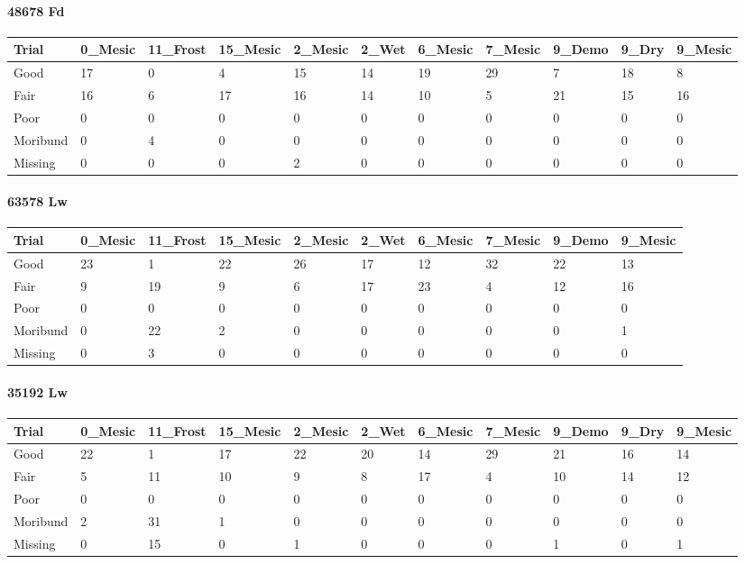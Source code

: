 \documentclass[
]{article}
\begin{document}
\hypertarget{fd-2}{%
\paragraph{48678 Fd}\label{fd-2}}

\begin{tabular}{l|l|l|l|l|l|l|l|l|l|l}
\hline
Trial & 0\_Mesic & 11\_Frost & 15\_Mesic & 2\_Mesic & 2\_Wet & 6\_Mesic & 7\_Mesic & 9\_Demo & 9\_Dry & 9\_Mesic\\
\hline
Good & 17 & 0 & 4 & 15 & 14 & 19 & 29 & 7 & 18 & 8\\
\hline
Fair & 16 & 6 & 17 & 16 & 14 & 10 & 5 & 21 & 15 & 16\\
\hline
Poor & 0 & 0 & 0 & 0 & 0 & 0 & 0 & 0 & 0 & 0\\
\hline
Moribund & 0 & 4 & 0 & 0 & 0 & 0 & 0 & 0 & 0 & 0\\
\hline
Missing & 0 & 0 & 0 & 2 & 0 & 0 & 0 & 0 & 0 & 0\\
\hline
\end{tabular}

\hypertarget{lw-2}{%
\paragraph{63578 Lw}\label{lw-2}}

\begin{tabular}{l|l|l|l|l|l|l|l|l|l}
\hline
Trial & 0\_Mesic & 11\_Frost & 15\_Mesic & 2\_Mesic & 2\_Wet & 6\_Mesic & 7\_Mesic & 9\_Demo & 9\_Mesic\\
\hline
Good & 23 & 1 & 22 & 26 & 17 & 12 & 32 & 22 & 13\\
\hline
Fair & 9 & 19 & 9 & 6 & 17 & 23 & 4 & 12 & 16\\
\hline
Poor & 0 & 0 & 0 & 0 & 0 & 0 & 0 & 0 & 0\\
\hline
Moribund & 0 & 22 & 2 & 0 & 0 & 0 & 0 & 0 & 1\\
\hline
Missing & 0 & 3 & 0 & 0 & 0 & 0 & 0 & 0 & 0\\
\hline
\end{tabular}

\hypertarget{lw-3}{%
\paragraph{35192 Lw}\label{lw-3}}

\begin{tabular}{l|l|l|l|l|l|l|l|l|l|l}
\hline
Trial & 0\_Mesic & 11\_Frost & 15\_Mesic & 2\_Mesic & 2\_Wet & 6\_Mesic & 7\_Mesic & 9\_Demo & 9\_Dry & 9\_Mesic\\
\hline
Good & 22 & 1 & 17 & 22 & 20 & 14 & 29 & 21 & 16 & 14\\
\hline
Fair & 5 & 11 & 10 & 9 & 8 & 17 & 4 & 10 & 14 & 12\\
\hline
Poor & 0 & 0 & 0 & 0 & 0 & 0 & 0 & 0 & 0 & 0\\
\hline
Moribund & 2 & 31 & 1 & 0 & 0 & 0 & 0 & 0 & 0 & 0\\
\hline
Missing & 0 & 15 & 0 & 1 & 0 & 0 & 0 & 1 & 0 & 1\\
\hline
\end{tabular}
\end{document}
